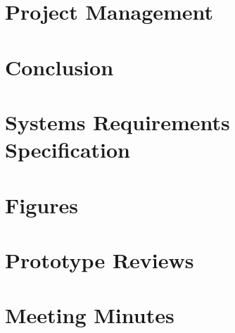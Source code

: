 \documentclass[12pt]{report}
\newcommand\blankpage{%
    \null
    \thispagestyle{empty}%
    \addtocounter{page}{-1}%
    \newpage}
\begin{document}
\chapter{Project Management}


\chapter{Conclusion}


\afterpage{\blankpage}

\begin{appendices}

\chapter{Systems Requirements Specification}


\chapter{Figures}


\chapter{Prototype Reviews} \label{Prototype Reviews}


\chapter{Meeting Minutes}


\end{appendices}

\printbibliography

\afterpage{\blankpage}
\end{document}
